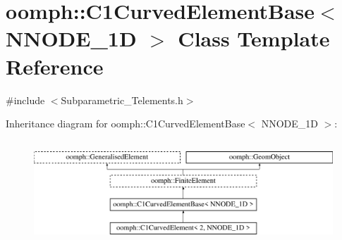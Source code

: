 \hypertarget{classoomph_1_1C1CurvedElementBase}{}\section{oomph\+:\+:C1\+Curved\+Element\+Base$<$ N\+N\+O\+D\+E\+\_\+1D $>$ Class Template Reference}
\label{classoomph_1_1C1CurvedElementBase}


{\ttfamily \#include $<$Subparametric\+\_\+\+Telements.\+h$>$}

Inheritance diagram for oomph\+:\+:C1\+Curved\+Element\+Base$<$ N\+N\+O\+D\+E\+\_\+1D $>$\+:\begin{figure}[H]
\begin{center}
\leavevmode
\includegraphics[height=3.929825cm]{classoomph_1_1C1CurvedElementBase}
\end{center}
\end{figure}
